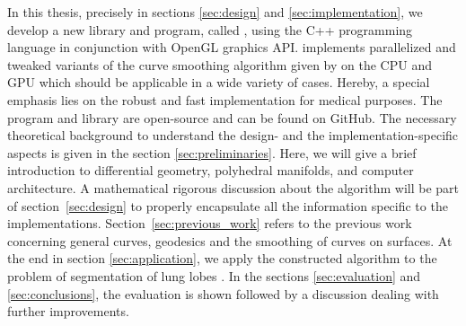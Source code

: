 \documentclass{stdlocal}
\begin{document}
In this thesis, precisely in sections \ref{sec:design} and \ref{sec:implementation}, we develop a new library and program, called , using the C++ programming language in conjunction with OpenGL graphics API.
 implements parallelized and tweaked variants of the curve smoothing algorithm given by \textcite{lawonn2014} on the CPU and GPU which should be applicable in a wide variety of cases.
Hereby, a special emphasis lies on the robust and fast implementation for medical purposes.
The program and library are open-source and can be found on GitHub.
The necessary theoretical background to understand the design- and the implementation-specific aspects is given in the section \ref{sec:preliminaries}.
Here, we will give a brief introduction to differential geometry, polyhedral manifolds, and computer architecture.
A mathematical rigorous discussion about the algorithm will be part of section~\ref{sec:design} to properly encapsulate all the information specific to the implementations.
Section~\ref{sec:previous_work} refers to the previous work concerning general curves, geodesics and the smoothing of curves on surfaces.
At the end in section \ref{sec:application}, we apply the constructed algorithm to the problem of segmentation of lung lobes \autocite{park2019}.
In the sections \ref{sec:evaluation} and \ref{sec:conclusions}, the evaluation is shown followed by a discussion dealing with further improvements.

\end{document}
